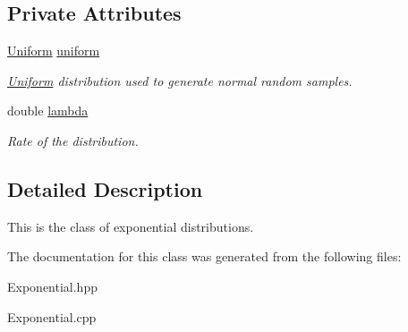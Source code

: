\subsection*{Private Attributes}
\begin{DoxyCompactItemize}
\item 
\mbox{\label{class_exponential_aa3770de1a84c5669672eb5ff4f5f26b0}} 
\hyperlink{class_uniform}{Uniform} \hyperlink{class_exponential_aa3770de1a84c5669672eb5ff4f5f26b0}{uniform}
\begin{DoxyCompactList}\small\item\em \hyperlink{class_uniform}{Uniform} distribution used to generate normal random samples. \end{DoxyCompactList}\item 
\mbox{\label{class_exponential_a2a48e288e649ddda226027379d0ce304}} 
double \hyperlink{class_exponential_a2a48e288e649ddda226027379d0ce304}{lambda}
\begin{DoxyCompactList}\small\item\em Rate of the distribution. \end{DoxyCompactList}\end{DoxyCompactItemize}


\subsection{Detailed Description}
This is the class of exponential distributions. 

The documentation for this class was generated from the following files\+:\begin{DoxyCompactItemize}
\item 
Exponential.\+hpp\item 
Exponential.\+cpp\end{DoxyCompactItemize}
